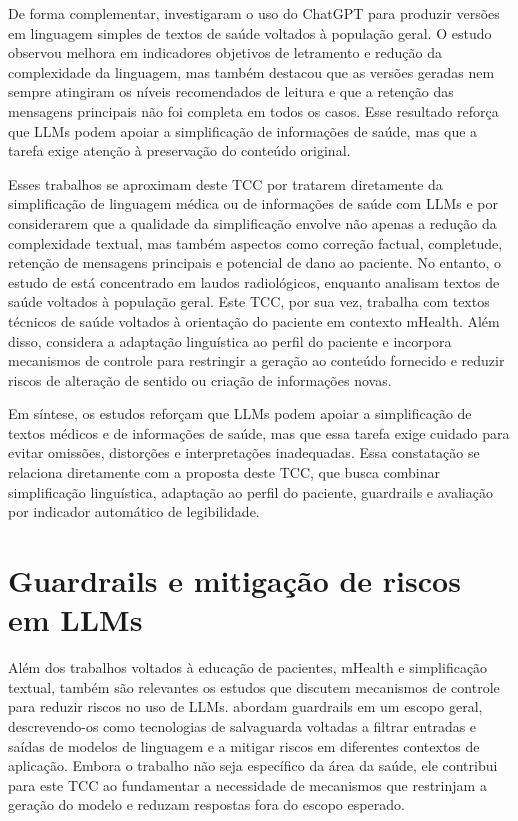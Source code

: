 De forma complementar,  investigaram o uso do ChatGPT para produzir versões em linguagem simples de textos de saúde voltados à população geral. O estudo observou melhora em indicadores objetivos de letramento e redução da complexidade da linguagem, mas também destacou que as versões geradas nem sempre atingiram os níveis recomendados de leitura e que a retenção das mensagens principais não foi completa em todos os casos. Esse resultado reforça que LLMs podem apoiar a simplificação de informações de saúde, mas que a tarefa exige atenção à preservação do conteúdo original.

Esses trabalhos se aproximam deste TCC por tratarem diretamente da simplificação de linguagem médica ou de informações de saúde com LLMs e por considerarem que a qualidade da simplificação envolve não apenas a redução da complexidade textual, mas também aspectos como correção factual, completude, retenção de mensagens principais e potencial de dano ao paciente. No entanto, o estudo de  está concentrado em laudos radiológicos, enquanto  analisam textos de saúde voltados à população geral. Este TCC, por sua vez, trabalha com textos técnicos de saúde voltados à orientação do paciente em contexto mHealth. Além disso, considera a adaptação linguística ao perfil do paciente e incorpora mecanismos de controle para restringir a geração ao conteúdo fornecido e reduzir riscos de alteração de sentido ou criação de informações novas.

Em síntese, os estudos reforçam que LLMs podem apoiar a simplificação de textos médicos e de informações de saúde, mas que essa tarefa exige cuidado para evitar omissões, distorções e interpretações inadequadas. Essa constatação se relaciona diretamente com a proposta deste TCC, que busca combinar simplificação linguística, adaptação ao perfil do paciente, guardrails e avaliação por indicador automático de legibilidade.

\section{Guardrails e mitigação de riscos em LLMs}
\label{sec:guardrails-mitigacao-riscos-llms}

Além dos trabalhos voltados à educação de pacientes, mHealth e simplificação textual, também são relevantes os estudos que discutem mecanismos de controle para reduzir riscos no uso de LLMs.  abordam guardrails em um escopo geral, descrevendo-os como tecnologias de salvaguarda voltadas a filtrar entradas e saídas de modelos de linguagem e a mitigar riscos em diferentes contextos de aplicação. Embora o trabalho não seja específico da área da saúde, ele contribui para este TCC ao fundamentar a necessidade de mecanismos que restrinjam a geração do modelo e reduzam respostas fora do escopo esperado.

